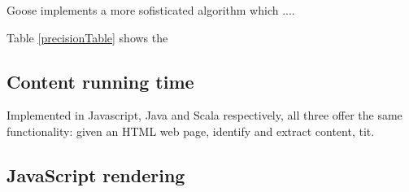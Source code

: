 



Goose implements a more sofisticated algorithm which ....


\cite{burton2011}

Table \ref{precisionTable} shows the
\precisionTable




\subsection{Content running time}

Implemented in Javascript, Java and Scala respectively, all three offer the same functionality: given an HTML web page, identify and extract content, tit.





\subsection{JavaScript rendering}

